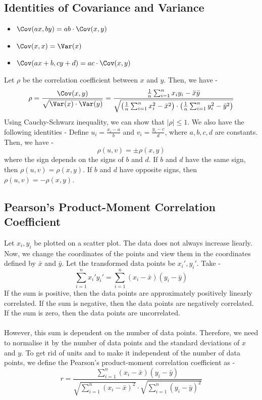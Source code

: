 \documentclass[openany]{book}
\begin{document}
\subsection{Identities of Covariance and Variance}
\begin{itemize}
    \item $\Cov(ax, by) = ab \cdot \Cov(x, y)$
    \item $\Cov(x, x) = \Var(x)$
    \item $\Cov(ax+ b, cy+d) = ac \cdot \Cov(x, y)$
\end{itemize}
Let $\rho$ be the correlation coefficient between $x$ and $y$. Then, we have -
$$\rho = \frac{\Cov(x, y)}{\sqrt{\Var(x) \cdot \Var(y)}} = \frac{\frac{1}{n} \sum_{i=1}^{n} x_i y_i - \bar{x} \bar{y}}{\sqrt{\left( \frac{1}{n} \sum_{i=1}^{n} x_i^2 - \bar{x}^2 \right) \cdot \left( \frac{1}{n} \sum_{i=1}^{n} y_i^2 - \bar{y}^2 \right)}}$$
Using Cauchy-Schwarz inequality, we can show that $|\rho| \leq 1$. We also have the following identities -
Define $u_i = \frac{x_i - a}{b}$ and $v_i = \frac{y_i - c}{d}$, where $a, b, c, d$ are constants. Then, we have -
$$\rho(u,v) = \pm \rho(x,y)$$
where the sign depends on the signs of $b$ and $d$. If $b$ and $d$ have the same sign, then $\rho(u,v) = \rho(x,y)$. If $b$ and $d$ have opposite signs, then $\rho(u,v) = -\rho(x,y)$.

\subsection{Pearson's Product-Moment Correlation Coefficient}
Let $x_i, y_i$ be plotted on a scatter plot. The data does not always increase liearly. Now, we change the coordinates of the points and view them in the coordinates defined by $\bar{x}$ and $\bar{y}$. Let the transformed data points be $x_i', y_i'$. 
Take - 
$$\sum_{i=1}^{n} x_i' y_i' = \sum_{i=1}^{n} (x_i - \bar{x})(y_i - \bar{y})$$
If the sum is positive, then the data points are approximately positively linearly correlated. If the sum is negative, then the data points are negatively correlated. If the sum is zero, then the data points are uncorrelated. \\\\
However, this sum is dependent on the number of data points. Therefore, we need to normalise it by the number of data points and the standard deviations of $x$ and $y$. To get rid of units and to make it independent of the number of data points, we define the Pearson's product-moment correlation coefficient as -
$$r = \frac{\sum_{i=1}^{n} (x_i - \bar{x})(y_i - \bar{y})}{\sqrt{\sum_{i=1}^{n} (x_i - \bar{x})^2} \cdot \sqrt{\sum_{i=1}^{n} (y_i - \bar{y})^2}}$$
\end{document}
